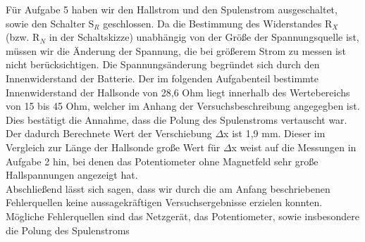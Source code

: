 \documentclass[12pt]{scrartcl}
\begin{document}
Für Aufgabe 5 haben wir den Hallstrom und den Spulenstrom ausgeschaltet, sowie den Schalter S$_R$ geschlossen. Da die Bestimmung des Widerstandes R$_X$ (bzw. R$_N$ in der Schaltskizze) unabhängig von der Größe der Spannungsquelle ist, müssen wir die Änderung der Spannung, die bei größerem Strom zu messen ist nicht berücksichtigen. Die Spannungsänderung begründet sich durch den Innenwiderstand der Batterie. Der im folgenden Aufgabenteil bestimmte Innenwiderstand der Hallsonde von 28,6 Ohm liegt innerhalb des Wertebereichs von 15 bis 45 Ohm, welcher im Anhang der Versuchsbeschreibung angegegben ist. Dies bestätigt die Annahme, dass die Polung des Spulenstroms vertauscht war. Der dadurch Berechnete Wert der Verschiebung $\Delta$x ist 1,9 mm. Dieser im Vergleich zur Länge der Hallsonde große Wert für $\Delta$x weist auf die  Messungen in Aufgabe 2 hin, bei denen das Potentiometer ohne Magnetfeld sehr große Hallspannungen angezeigt hat.\\
Abschließend lässt sich sagen, dass wir durch die am Anfang beschriebenen Fehlerquellen keine aussagekräftigen Versuchsergebnisse erzielen konnten. Mögliche Fehlerquellen sind das Netzgerät, das Potentiometer, sowie insbesondere die Polung des Spulenstroms  
\end{document}
